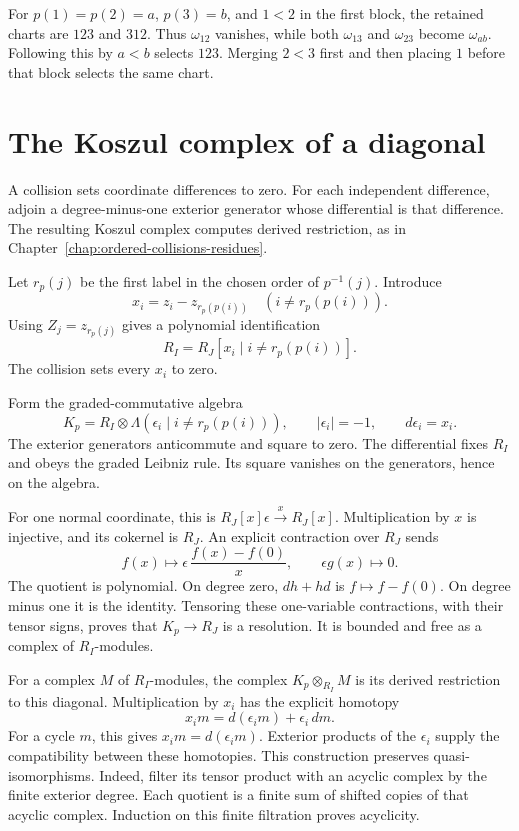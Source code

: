 For $p(1)=p(2)=a$, $p(3)=b$, and $1<2$ in the first block,
the retained charts are $123$ and $312$.
Thus $\omega_{12}$ vanishes, while both $\omega_{13}$ and
$\omega_{23}$ become $\omega_{ab}$.
Following this by $a<b$ selects $123$.
Merging $2<3$ first and then placing $1$ before that block
selects the same chart.

\section{The Koszul complex of a diagonal}

A collision sets coordinate differences to zero.
For each independent difference, adjoin a degree-minus-one exterior
generator whose differential is that difference.
The resulting Koszul complex computes derived restriction, as in
Chapter~\ref{chap:ordered-collisions-residues}.

Let $r_p(j)$ be the first label in the chosen order of $p^{-1}(j)$.
Introduce
\[
 x_i=z_i-z_{r_p(p(i))}\quad(i\ne r_p(p(i))).
\]
Using $Z_j=z_{r_p(j)}$ gives a polynomial identification
\[
 R_I=R_J[x_i\mid i\ne r_p(p(i))].
\]
The collision sets every $x_i$ to zero.

Form the graded-commutative algebra
\[
 K_p=R_I\otimes\Lambda(\epsilon_i\mid i\ne r_p(p(i))),
 \qquad |\epsilon_i|=-1,\qquad d\epsilon_i=x_i.
\]
The exterior generators anticommute and square to zero.
The differential fixes $R_I$ and obeys the graded Leibniz rule.
Its square vanishes on the generators, hence on the algebra.

For one normal coordinate, this is
$R_J[x]\epsilon\xrightarrow{x}R_J[x]$.
Multiplication by $x$ is injective, and its cokernel is $R_J$.
An explicit contraction over $R_J$ sends
\[
 f(x)\longmapsto
 \epsilon\,\frac{f(x)-f(0)}{x},
 \qquad \epsilon g(x)\longmapsto0.
\]
The quotient is polynomial.
On degree zero, $dh+hd$ is $f\mapsto f-f(0)$.
On degree minus one it is the identity.
Tensoring these one-variable contractions, with their tensor
signs, proves that $K_p\to R_J$ is a resolution.
It is bounded and free as a complex of $R_I$-modules.

For a complex $M$ of $R_I$-modules, the complex
$K_p\otimes_{R_I}M$ is its derived restriction to this diagonal.
Multiplication by $x_i$ has the explicit homotopy
\[
 x_i m=d(\epsilon_i m)+\epsilon_i\,dm.
\]
For a cycle $m$, this gives $x_i m=d(\epsilon_i m)$.
Exterior products of the $\epsilon_i$ supply the compatibility
between these homotopies.
This construction preserves quasi-isomorphisms.
Indeed, filter its tensor product with an acyclic complex by the
finite exterior degree. Each quotient is a finite sum of shifted
copies of that acyclic complex. Induction on this finite
filtration proves acyclicity.

